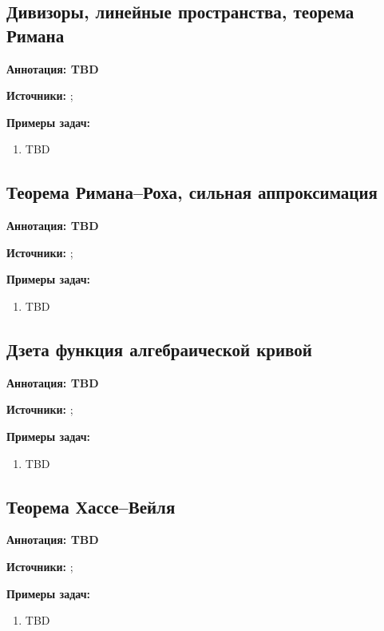 \documentclass[a4paper, 12pt]{article}
\begin{document}
\subsection{Дивизоры, линейные пространства, теорема Римана}

{\bf Аннотация: TBD}

{\bf Источники:} \cite{Stich}; \cite{Step}

{\bf Примеры задач:}
\begin{enumerate}[noitemsep,topsep=0pt]
    
    \item TBD
\end{enumerate}

\subsection{Теорема Римана--Роха, сильная аппроксимация}

{\bf Аннотация: TBD}

{\bf Источники:} \cite{Stich}; \cite{Step}

{\bf Примеры задач:}
\begin{enumerate}[noitemsep,topsep=0pt]
    
    \item TBD
\end{enumerate}

\subsection{Дзета функция алгебраической кривой}

{\bf Аннотация: TBD}

{\bf Источники:} \cite{Step}; \cite{Stich}

{\bf Примеры задач:}
\begin{enumerate}[noitemsep,topsep=0pt]
    
    \item TBD
\end{enumerate}

\subsection{Теорема Хассе--Вейля}

{\bf Аннотация: TBD}

{\bf Источники:} \cite{Step}; \cite{Stich}

{\bf Примеры задач:}
\begin{enumerate}[noitemsep,topsep=0pt]
    
    \item TBD
\end{enumerate}
\end{document}
